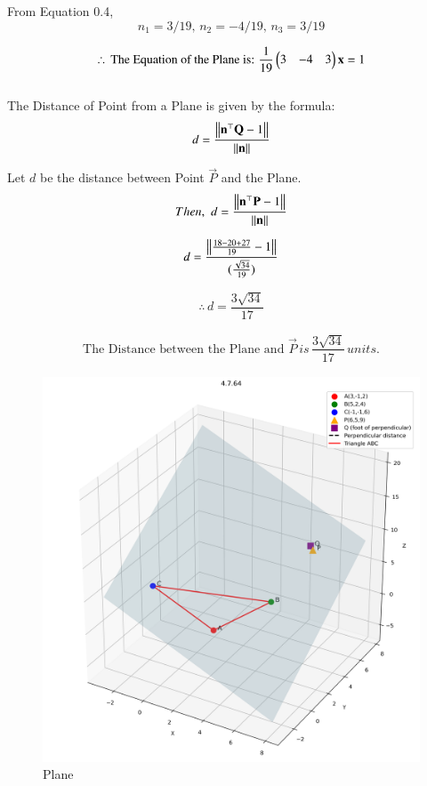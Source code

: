 \documentclass[journal]{IEEEtran}
\begin{document}
From Equation 0.4,
\begin{equation}
    n_1 = 3/19, \, n_2 = -4/19, \, n_3 = 3/19
\end{equation}

\begin{equation}
\therefore \, \text{The Equation of the Plane is: } \dfrac{1}{19}\begin{pmatrix}3 & -4 & 3\end{pmatrix}\mathbf{x} = 1
\end{equation}\\

The Distance of Point from a Plane is given by the formula:
\begin{equation}
    d = \dfrac{\left\lVert\mathbf{n}^\top\mathbf{Q}-1\right\rVert}{\left\lVert\mathbf{n}\right\rVert}
\end{equation}

Let $d$ be the distance between Point $\vec{P}$ and the Plane.
\begin{equation}
    Then, \, \, d = \dfrac{\left\lVert\mathbf{n}^\top\mathbf{P}-1\right\rVert}{\left\lVert\mathbf{n}\right\rVert}
\end{equation}

\begin{equation}
    d= \dfrac{\left\lVert\frac{18-20+27}{19}-1\right\rVert}{(\frac{\sqrt{34}}{19})}
\end{equation}

\begin{equation}
\therefore \, d = \dfrac{3\sqrt{34}}{17}    
\end{equation}

\begin{align}
    \boxed{\text{The Distance between the Plane and } \vec{P} \, is \, \dfrac{3\sqrt{34}}{17} \, units.}
\end{align}

\begin{figure}[htbp]
    \centering
    \includegraphics[width=0.95\columnwidth]{figs/fig1.png}
    \caption{Plane}
    \label{fig:fig/fig1.png}
\end{figure}
\end{document}
